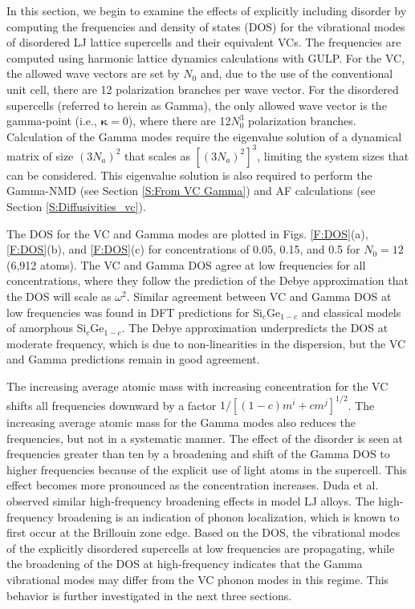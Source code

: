 In this section, we begin to examine the effects of explicitly including 
disorder by computing the frequencies and density of states (DOS)  
for the vibrational modes of disordered LJ lattice supercells and their 
equivalent VCs. The frequencies 
are computed using harmonic lattice dynamics calculations with  
GULP.\cite{gale_general_2003}  For the 
VC, the allowed wave vectors are set by $N_0$ and, due to the use of the 
conventional unit cell, there are 12 
polarization branches per wave vector.  
For the disordered supercells (referred to herein as Gamma),
the only allowed wave vector is the gamma-point (i.e., $\pmb{\kappa}=0$),  
where there are 12$N_0^3$ polarization branches. Calculation of the 
Gamma modes require the eigenvalue solution of a dynamical matrix of size 
$(3N_a)^2$ that scales as $[(3N_a)^2]^3$, limiting the system 
sizes that can be considered. This eigenvalue solution is also 
required to perform the Gamma-NMD (see Section \ref{S:From VC Gamma})  
and AF calculations (see Section \ref{S:Diffusivities_vc}). 

The DOS for the VC and Gamma modes are plotted in Figs. \ref{F:DOS}(a), 
\ref{F:DOS}(b), and \ref{F:DOS}(c) 
for concentrations of 0.05, 0.15, and 0.5 for 
$N_0=12$ (6,912 atoms). The VC and Gamma DOS 
agree at low frequencies for all concentrations, 
where they follow the prediction of the Debye approximation that 
the DOS will scale as $\omega^2$.\cite{ashcroft_solid_1976} 
Similar agreement between VC and Gamma DOS at low frequencies 
was found in DFT predictions 
for Si$_c$Ge$_{1-c}$\cite{garg_role_2011} and 
classical models of amorphous Si$_c$Ge$_{1-c}$.
\cite{bouchard_vibrational_1988} The Debye approximation 
underpredicts the DOS at moderate frequency, which is due to 
non-linearities in the dispersion,\cite{ashcroft_solid_1976} but the 
VC and Gamma predictions remain in good agreement. 

The increasing average atomic  
mass with increasing concentration for the VC shifts all   
frequencies downward by a factor $1/[(1-c)m^i + cm^j]^{1/2}$. 
The increasing average atomic 
mass for the Gamma modes also reduces the frequencies, but not in a 
systematic manner. 
The effect of the disorder is seen at frequencies greater than 
ten by a broadening and shift of the Gamma DOS to higher frequencies 
because of the explicit use of light atoms in the supercell. This effect 
becomes more pronounced as the concentration increases.  
Duda et al. 
observed similar high-frequency broadening effects in model LJ alloys.
\cite{duda_reducing_2011} The high-frequency broadening is an indication 
of phonon localization, which is known to first occur at the 
Brillouin zone edge.\cite{chu_effect_1989} 
Based on the DOS, the vibrational modes of the explicitly disordered 
supercells at low frequencies are propagating, while the 
broadening of the DOS at high-frequency indicates that the Gamma 
vibrational modes may differ from the VC phonon modes in this regime. 
This behavior is further investigated in the next three sections. 

